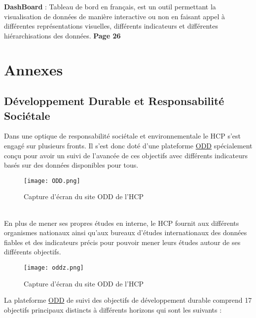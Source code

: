 \documentclass[a4paper,french,12pt]{article}
\begin{document}
\textbf{DashBoard} : Tableau de bord en français, est un outil permettant la visualisation de données de manière interactive ou non en faisant appel à différentes représentations visuelles, différents indicateurs et différentes hiérarchisations des données. \textbf{Page 26}\\

\newpage

\section{Annexes}
\label{sec:Annexes}

\subsection{Développement Durable et Responsabilité Sociétale}

Dans une optique de responsabilité sociétale et environnementale le HCP s'est engagé sur plusieurs fronts. Il s'est donc doté d'une plateforme \href{http://plateforme-odd.hcp.ma/ODD_HCP/fr/}{ODD} spécialement conçu pour avoir un suivi de l'avancée de ces objectifs avec différents indicateurs basés sur des données disponibles pour tous.\\

\begin{figure}[!h]
    \centering
    \texttt{[image: ODD.png]}
    \caption{Capture d'écran du site ODD de l'HCP}
\end{figure}\\

En plus de mener ses propres études en interne, le HCP fournit aux différents organismes nationaux ainsi qu'aux bureaux d'études internationaux des données fiables et des indicateurs précis pour pouvoir mener leurs études autour de ses différents objectifs.\\

\begin{figure}[!h]
    \centering
    \texttt{[image: oddz.png]}
    \caption{Capture d'écran du site ODD de l'HCP}
\end{figure}

\newpage

La plateforme \href{http://plateforme-odd.hcp.ma/ODD_HCP/fr/}{ODD} de suivi des objectifs de développement durable comprend 17 objectifs principaux distincts à différents horizons qui sont les suivants :\\
\end{document}
